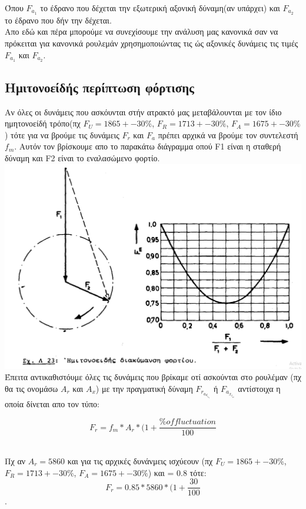 \documentclass{article}
\begin{document}
\vspace{1.5cm}


Όπου $F_a_1$ το έδρανο που δέχεται την εξωτερική αξονική δύναμη(αν υπάρχει) και $F_a_2$ το έδρανο που δήν την δέχεται.
\\
Απο εδώ και πέρα μπορούμε να συνεχίσουμε την ανάλυση μας κανονικά σαν να πρόκειται για κανονικά ρουλεμάν χρησημοποιώντας τις ώς αξονικές δυνάμεις τις τιμές $F_a_1$ και $F_a_2$.
\\
 \clearpage
 







\subsection{Ημιτονοείδής περίπτωση φόρτισης}
Αν όλες οι δυνάμεις που ασκόυνται στήν ατρακτό μας μεταβάλουνται με τον ίδιο ημητονοείδή τρόπο(πχ $F_U = 1865 +- 30\%$, $F_R = 1713 +- 30\%$, $F_A = 1675 +- 30\%$) τότε για να βρούμε τις δυνάμεις $F_r$ και $F_a$ πρέπει αρχικά να βρούμε τον συντελεστή $f_m$. Αυτόν τον βρίσκουμε απο το παρακάτω διάγραμμα οπού F1 είναι η σταθερή δύναμη και F2 είναι το εναλασώμενο φορτίο.
\\
\includegraphics[width=1\linewidth]{3.2.png}
\\
Έπειτα αντικαθιστόυμε όλες τις δυνάμεις που βρίκαμε οτί ασκούνται στο ρουλέμαν (πχ θα τις ονομάσω $A_r$ και $A_x$) με την πραγματική δύναμη $F_r_a_d_i_a_L$ ή $F_a_x_i_a_l$ αντίστοιχα η οποία δίνεται απο τον τύπο:
\\
\begin{center}
    \[ F_r = f_m * A_r * (1+ \frac{\% of fluctuation}{100} \]
\end{center}
\\
Πχ αν $Α_r = 5860$ και για τις αρχικές δυνάνμεις ισχύεουν (πχ $F_U = 1865 +- 30\%$, $F_R = 1713 +- 30\%$, $F_A = 1675 +- 30\%$) και  = 0.8 τότε:
\\
\[ F_r = 0.85 * 5860 * (1+ \frac{30}{100} \].
    
\end{document}
